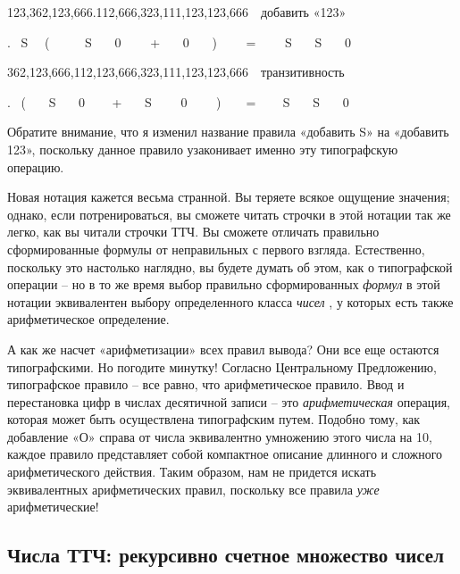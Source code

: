\documentclass[../main.tex]{subfiles}
\begin{document}
123,362,123,666.112,666,323,111,123,123,666~~добавить «123»

. ~S~~ (~~~~~ S~~~ 0~~~~ +~~ ~0~~~ )~~~~ =~~~~ S~~~ S~~~ 0

362,123,666,112,123,666,323,111,123,123,666~~транзитивность

.~ (~~~ S~~~ 0 ~~~ +~~~ S~~~~ 0~~~~ )~~~~= ~~~ S~~ ~S~~~ 0

Обратите внимание, что я изменил название правила «добавить S» на «добавить 123», поскольку данное правило узаконивает именно эту типографскую операцию.

Новая нотация кажется весьма странной. Вы теряете всякое ощущение значения; однако, если потренироваться, вы сможете читать строчки в этой нотации так же легко, как вы читали строчки ТТЧ\@. Вы сможете отличать правильно сформированные формулы от неправильных с первого взгляда. Естественно, поскольку это настолько наглядно, вы будете думать об этом, как о типографской операции \--- но в то же время выбор правильно сформированных \emph{формул} в этой нотации эквивалентен выбору определенного класса \emph{чисел} , у которых есть также арифметическое определение.

А как же насчет «арифметизации» всех правил вывода? Они все еще остаются типографскими. Но погодите минутку! Согласно Центральному Предложению, типографское правило \--- все равно, что арифметическое правило. Ввод и перестановка цифр в числах десятичной записи \--- это \emph{арифметическая} операция, которая может быть осуществлена типографским путем. Подобно тому, как добавление «О» справа от числа эквивалентно умножению этого числа на 10, каждое правило представляет собой компактное описание длинного и сложного арифметического действия. Таким образом, нам не придется искать эквивалентных арифметических правил, поскольку все правила \emph{уже} арифметические!


\subsection{Числа ТТЧ: рекурсивно счетное множество чисел}
\end{document}
